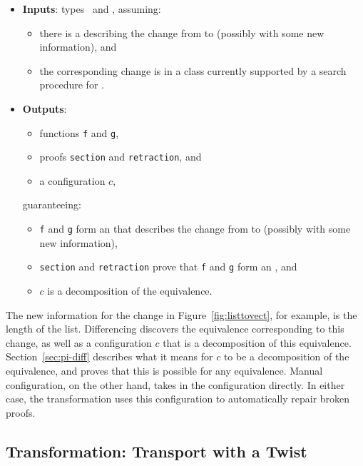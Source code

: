 \begin{itemize}
\item \textbf{Inputs}: types \Aa\ and \B, assuming:
\begin{itemize}
\item there is a  describing the change from \Aa to \B (possibly with some new information), and
\item the corresponding change is in a class currently supported by a search procedure for .
\end{itemize}
\item \textbf{Outputs}:
\begin{itemize}
\item functions \lstinline{f} and \lstinline{g},
\item proofs \lstinline{section} and \lstinline{retraction}, and
\item a configuration $c$,
\end{itemize}
guaranteeing:
\begin{itemize}
\item \lstinline{f} and \lstinline{g} form an  that describes the change from \Aa to \B (possibly with some new information),
\item \lstinline{section} and \lstinline{retraction} prove that \lstinline{f} and \lstinline{g} form an , and
\item $c$ is a decomposition of the equivalence.
\end{itemize}
\end{itemize}
The new information for the change in Figure~\ref{fig:listtovect}, for example, is the length of the list.
Differencing discovers the equivalence corresponding to this change, as well as a configuration $c$ that is a decomposition of this equivalence.
Section~\ref{sec:pi-diff} describes what it means for $c$ to be a decomposition of the equivalence,
and proves that this is possible for any equivalence.
Manual configuration, on the other hand, takes in the configuration directly.
In either case, the transformation uses this configuration to automatically repair broken proofs.


\subsection{Transformation: Transport with a Twist}
\label{sec:pi-spec-trans}

